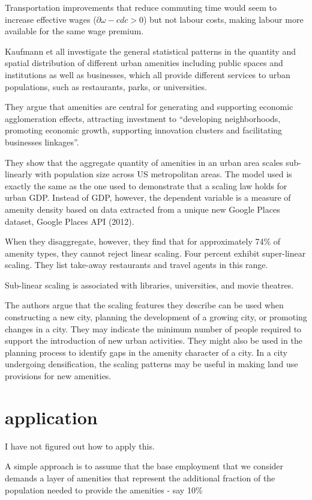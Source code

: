 Transportation improvements that reduce commuting time would seem to increase effective wages ($\partial{\omega-cd}{c}>0$) but not labour costs, making labour more available for the same wage premium. 

Kaufmann et all investigate the  general statistical patterns in the quantity and spatial distribution of different urban amenities including public spaces and institutions as well as businesses, which all provide different services to urban populations, such as  restaurants, parks, or universities. 

They argue that amenities are  central for generating and supporting economic agglomeration effects, attracting investment to ``developing neighborhoods, promoting economic growth, supporting innovation clusters and facilitating businesses linkages''. 

They show that the aggregate quantity of amenities in an urban area  scales sub-linearly  with population size across US metropolitan areas. The model used is exactly the same as the one used to demonstrate that a scaling law holds for  urban GDP. Instead of GDP, however, the dependent variable is a measure of amenity density based on data extracted from a unique new Google Places dataset, Google Places API (2012).

When they disaggregate, however, they find that for approximately 74\% of amenity types, they cannot reject linear scaling. Four percent exhibit super-linear scaling. They list take-away restaurants and travel agents in this range. 

Sub-linear scaling is associated with libraries, universities, and movie theatres.

The authors argue that the scaling features they describe can be used when constructing a new city, planning the development of a growing city, or promoting changes in a city. They may indicate the minimum number of people required to support the introduction of new urban activities. They might also be used in the planning process to identify gaps in the amenity character of a city. In a city undergoing densification, the scaling patterns may be useful in  making land use provisions for new amenities.

\section{application}
I have not figured out how to apply this. 

A simple approach is to assume that the base employment that we consider demands a layer of amenities that represent the additional fraction of  the population needed to provide the amenities - say 10\%


